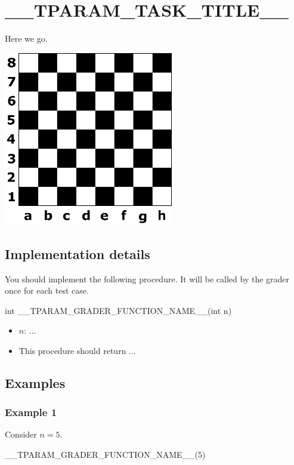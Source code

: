 \documentclass[12pt,a4paper]{article}
\begin{document}


\section*{__TPARAM_TASK_TITLE__}

Here we go.

\begin{center}
\includegraphics[width=.5\textwidth]{board.png}
\end{center}

\subsection*{Implementation details}

You should implement the following procedure.
It will be called by the grader once for each test case.

\begin{prog}
int __TPARAM_GRADER_FUNCTION_NAME__(int n)
\end{prog}

\begin{itemize}
    \item $n$: ...
    \item This procedure should return ...
\end{itemize}


\subsection*{Examples}

\subsubsection*{Example 1}

Consider $n=5$.

\begin{prog}
__TPARAM_GRADER_FUNCTION_NAME__(5)
\end{prog}
\end{document}
